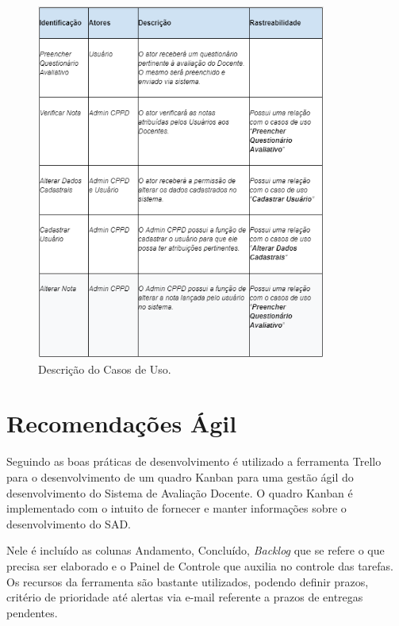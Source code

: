     \begin{figure}[h]
    \centering
    \includegraphics[width=0.85\textwidth]{./img/DescricaoCasoUso.png}
    \caption{Descrição do Casos de Uso.}
    \label{fig:DescricaoCasoUso}
    \end{figure}
  
\section{Recomendações Ágil} 

    Seguindo as boas práticas de desenvolvimento é utilizado a ferramenta Trello para o desenvolvimento de um quadro Kanban para uma gestão ágil do desenvolvimento do Sistema de Avaliação Docente. O quadro Kanban é implementado com o intuito de fornecer e manter informações sobre o desenvolvimento do SAD.

    Nele é incluído as colunas Andamento, Concluído, \textit{Backlog} que se refere o que precisa ser elaborado e o Painel de Controle que auxilia no controle das tarefas. Os recursos da ferramenta são bastante utilizados, podendo definir prazos, critério de prioridade até alertas via e-mail referente a prazos de entregas pendentes. 
    
